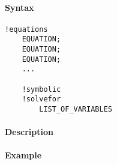 


	\paragraph{Syntax}\label{syntax}

\begin{verbatim}
!equations
    EQUATION;
    EQUATION;
    EQUATION;
    ...

    !symbolic
    !solvefor
        LIST_OF_VARIABLES
\end{verbatim}

\paragraph{Description}\label{description}

\paragraph{Example}\label{example}


